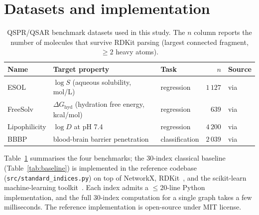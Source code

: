\documentclass[STIX1COL]{WileyNJDv5}
\theoremstyle{definition}
\begin{document}
\section{Datasets and implementation}\label{sec:datasets}

\begin{table}[h]
\centering
\caption{QSPR/QSAR benchmark datasets used in this study. The $n$ column reports the number of molecules that survive RDKit parsing (largest connected fragment, $\ge 2$ heavy atoms).}
\label{tab:datasets}
\begin{tabular}{lllrl}
\toprule
Name & Target property & Task & $n$ & Source\\
\midrule
ESOL          & $\log S$ (aqueous solubility, mol/L)         & regression     & $1\,127$ & \cite{Delaney2004ESOL} via \cite{MoleculeNet}\\
FreeSolv      & $\Delta G_{\mathrm{hyd}}$ (hydration free energy, kcal/mol) & regression & $639$    & \cite{Mobley2014FreeSolv} via \cite{MoleculeNet}\\
Lipophilicity & $\log D$ at pH 7.4                            & regression     & $4\,200$ & \cite{LipophilicityChEMBL} via \cite{MoleculeNet}\\
BBBP          & blood-brain barrier penetration               & classification & $2\,039$ & \cite{Martins2012BBBP} via \cite{MoleculeNet}\\
\bottomrule
\end{tabular}
\end{table}

Table~\ref{tab:datasets} summarises the four benchmarks; the
$30$-index classical baseline (Table~\ref{tab:baseline}) is
implemented in the reference codebase
(\texttt{src/standard\_indices.py}) on top of
NetworkX, RDKit~\cite{RDKit}, and the scikit-learn machine-learning
toolkit~\cite{Pedregosa2011sklearn}. Each index admits a
$\le 20$-line Python implementation, and the full $30$-index
computation for a single graph takes a few milliseconds. The
reference implementation is open-source under MIT license.
\end{document}
